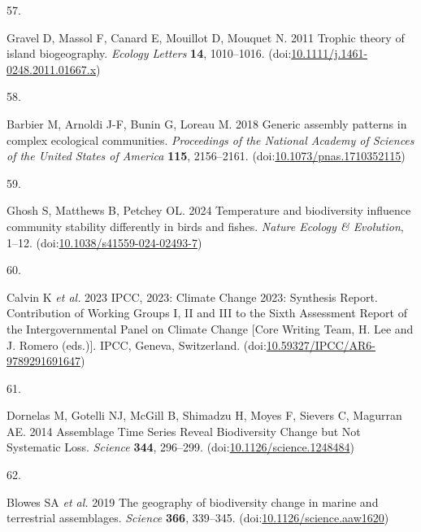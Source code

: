 \documentclass[
]{article}
\newlength{\cslhangindent}
\newlength{\csllabelwidth}
\newlength{\cslentryspacingunit} %
\newenvironment{CSLReferences}[2] %
 {%
  \setlength{\parindent}{0pt}
  \ifodd #1
  \let\oldpar\par
  \def\par{\hangindent=\cslhangindent\oldpar}
  \fi
  \setlength{\parskip}{#2\cslentryspacingunit}
 }%
 {}
\newcommand{\CSLLeftMargin}[1]{\parbox[t]{\csllabelwidth}{#1}}
\newcommand{\CSLRightInline}[1]{\parbox[t]{\linewidth - \csllabelwidth}{#1}\break}
\begin{document}
\begin{CSLReferences}{0}{0}
\leavevmode{}%
\CSLLeftMargin{57. }%
\CSLRightInline{Gravel D, Massol F, Canard E, Mouillot D, Mouquet N. 2011 Trophic theory of island biogeography. \emph{Ecology Letters} \textbf{14}, 1010--1016. (doi:\href{https://doi.org/10.1111/j.1461-0248.2011.01667.x}{10.1111/j.1461-0248.2011.01667.x})}

\leavevmode{}%
\CSLLeftMargin{58. }%
\CSLRightInline{Barbier M, Arnoldi J-F, Bunin G, Loreau M. 2018 Generic assembly patterns in complex ecological communities. \emph{Proceedings of the National Academy of Sciences of the United States of America} \textbf{115}, 2156--2161. (doi:\href{https://doi.org/10.1073/pnas.1710352115}{10.1073/pnas.1710352115})}

\leavevmode{}%
\CSLLeftMargin{59. }%
\CSLRightInline{Ghosh S, Matthews B, Petchey OL. 2024 Temperature and biodiversity influence community stability differently in birds and fishes. \emph{Nature Ecology \& Evolution}, 1--12. (doi:\href{https://doi.org/10.1038/s41559-024-02493-7}{10.1038/s41559-024-02493-7})}

\leavevmode{}%
\CSLLeftMargin{60. }%
\CSLRightInline{Calvin K \emph{et al.} 2023 {IPCC}, 2023: {Climate} {Change} 2023: {Synthesis} {Report}. {Contribution} of {Working} {Groups} {I}, {II} and {III} to the {Sixth} {Assessment} {Report} of the {Intergovernmental} {Panel} on {Climate} {Change} {[}{Core} {Writing} {Team}, {H}. {Lee} and {J}. {Romero} (eds.){]}. {IPCC}, {Geneva}, {Switzerland}. (doi:\href{https://doi.org/10.59327/IPCC/AR6-9789291691647}{10.59327/IPCC/AR6-9789291691647})}

\leavevmode{}%
\CSLLeftMargin{61. }%
\CSLRightInline{Dornelas M, Gotelli NJ, McGill B, Shimadzu H, Moyes F, Sievers C, Magurran AE. 2014 Assemblage {Time} {Series} {Reveal} {Biodiversity} {Change} but {Not} {Systematic} {Loss}. \emph{Science} \textbf{344}, 296--299. (doi:\href{https://doi.org/10.1126/science.1248484}{10.1126/science.1248484})}

\leavevmode{}%
\CSLLeftMargin{62. }%
\CSLRightInline{Blowes SA \emph{et al.} 2019 The geography of biodiversity change in marine and terrestrial assemblages. \emph{Science} \textbf{366}, 339--345. (doi:\href{https://doi.org/10.1126/science.aaw1620}{10.1126/science.aaw1620})}


\end{CSLReferences}
\end{document}
